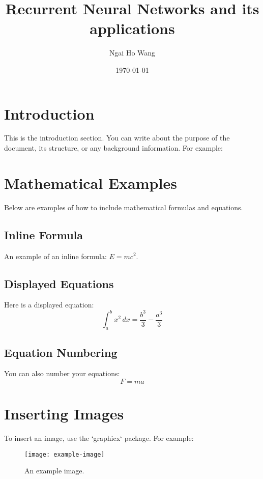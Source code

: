 \documentclass[12pt,a4paper]{article}
\title{Recurrent Neural Networks and its applications}
\author{Ngai Ho Wang}
\date{\today} %
\begin{document}
\maketitle

\tableofcontents %
\newpage

\section{Introduction}
This is the introduction section. You can write about the purpose of the document, its structure, or any background information. For example:

\lipsum[1] %

\section{Mathematical Examples}
Below are examples of how to include mathematical formulas and equations.

\subsection{Inline Formula}
An example of an inline formula: \( E = mc^2 \).

\subsection{Displayed Equations}
Here is a displayed equation:
\[
\int_{a}^{b} x^2 \, dx = \frac{b^3}{3} - \frac{a^3}{3}
\]

\subsection{Equation Numbering}
You can also number your equations:
\begin{equation}
    F = ma
\end{equation}

\section{Inserting Images}
To insert an image, use the `graphicx` package. For example:

\begin{figure}[h!]
    \centering
    \texttt{[image: example-image]} %
    \caption{An example image.}
    \label{fig:example}
\end{figure}
\end{document}
